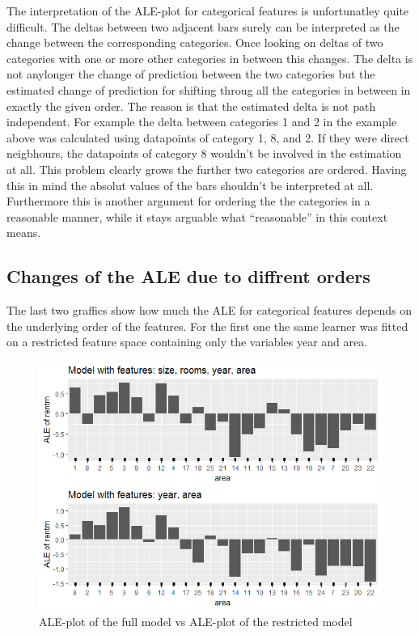 \documentclass[
]{krantz}
\begin{document}
The interpretation of the ALE-plot for categorical features is unfortunatley quite difficult. The deltas between two adjacent bars surely can be interpreted as the change between the corresponding categories. Once looking on deltas of two categories with one or more other categories in between this changes. The delta is not anylonger the change of prediction between the two categories but the estimated change of prediction for shifting throug all the categories in between in exactly the given order. The reason is that the estimated delta is not path independent. For example the delta between categories 1 and 2 in the example above was calculated using datapoints of category 1, 8, and 2. If they were direct neigbhours, the datapoints of category 8 wouldn't be involved in the estimation at all. This problem clearly grows the further two categories are ordered. Having this in mind the absolut values of the bars shouldn't be interpreted at all. Furthermore this is another argument for ordering the the categories in a reasonable manner, while it stays arguable what ``reasonable'' in this context means.

\hypertarget{changes-of-the-ale-due-to-diffrent-orders}{%
\subsection{Changes of the ALE due to diffrent orders}\label{changes-of-the-ale-due-to-diffrent-orders}}

The last two graffics show how much the ALE for categorical features depends on the underlying order of the features. For the first one the same learner was fitted on a restricted feature space containing only the variables year and area.

\begin{figure}
\includegraphics[width=1\linewidth]{images/ALE_2_cat_different_features_} \caption{ALE-plot of the full model vs ALE-plot of the restricted model}\label{fig:ALE2catrestrmod}
\end{figure}
\end{document}
